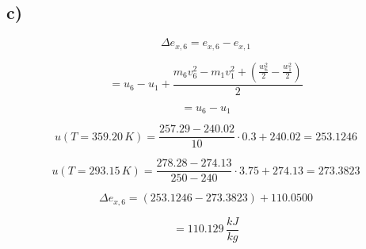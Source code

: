 

\subsection*{c)}

\[
\Delta e_{x,6} = e_{x,6} - e_{x,1}
\]

\[
= u_6 - u_1 + \frac{m_6 v_6^2 - m_1 v_1^2 + \left( \frac{w_6^2}{2} - \frac{w_1^2}{2} \right)}{2}
\]

\[
= u_6 - u_1
\]

\[
u(T = 359.20 \, K) = \frac{257.29 - 240.02}{10} \cdot 0.3 + 240.02 = 253.1246
\]

\[
u(T = 293.15 \, K) = \frac{278.28 - 274.13}{250 - 240} \cdot 3.75 + 274.13 = 273.3823
\]

\[
\Delta e_{x,6} = (253.1246 - 273.3823) + 110.0500
\]

\[
= 110.129 \, \frac{kJ}{kg}
\]